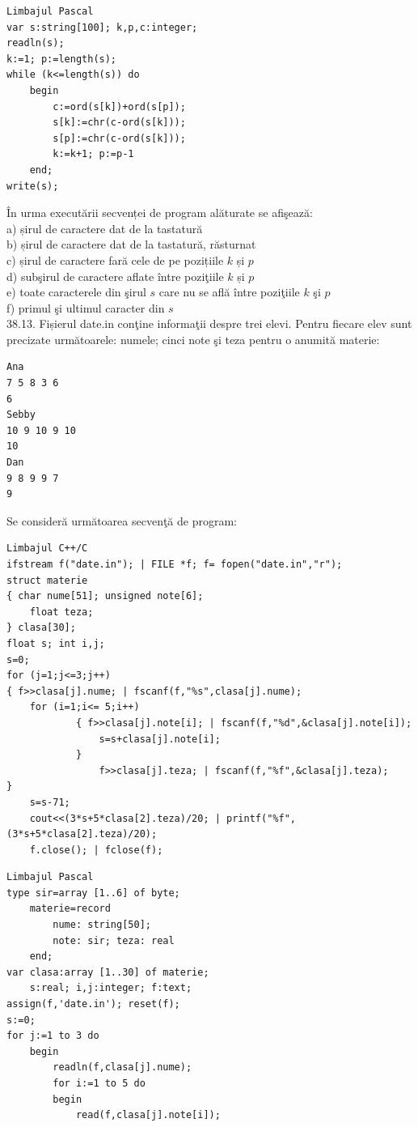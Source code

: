 \begin{itemize}
\begin{enumerate}
\begin{verbatim}
\end{verbatim}
\begin{verbatim}
Limbajul Pascal
var s:string[100]; k,p,c:integer;
readln(s);
k:=1; p:=length(s);
while (k<=length(s)) do
    begin
        c:=ord(s[k])+ord(s[p]);
        s[k]:=chr(c-ord(s[k]));
        s[p]:=chr(c-ord(s[k]));
        k:=k+1; p:=p-1
    end;
write(s);
\end{verbatim}
În urma executării secvenței de program alăturate se afişează:
\\
a) șirul de caractere dat de la tastatură
\\
b) șirul de caractere dat de la tastatură, răsturnat
\\
c) șirul de caractere fară cele de pe pozițiile $k$ și $p$
\\
d) subşirul de caractere aflate între poziţiile $k$ și $p$
\\
e) toate caracterele din şirul $s$ care nu se află între poziţiile $k$ şi $p$
\\
f) primul şi ultimul caracter din $s$
\\
38.13. Fișierul date.in conţine informaţii despre trei elevi. Pentru fiecare elev sunt precizate următoarele: numele; cinci note şi teza pentru o anumită materie:
\begin{verbatim}
Ana
7 5 8 3 6
6
Sebby
10 9 10 9 10
10
Dan
9 8 9 9 7
9
\end{verbatim}
Se consideră următoarea secvenţă de program:
\begin{verbatim}
Limbajul C++/C
ifstream f("date.in"); | FILE *f; f= fopen("date.in","r");
struct materie
{ char nume[51]; unsigned note[6];
    float teza;
} clasa[30];
float s; int i,j;
s=0;
for (j=1;j<=3;j++)
{ f>>clasa[j].nume; | fscanf(f,"%s",clasa[j].nume);
    for (i=1;i<= 5;i++)
            { f>>clasa[j].note[i]; | fscanf(f,"%d",&clasa[j].note[i]);
                s=s+clasa[j].note[i];
            }
                f>>clasa[j].teza; | fscanf(f,"%f",&clasa[j].teza);
}
    s=s-71;
    cout<<(3*s+5*clasa[2].teza)/20; | printf("%f",(3*s+5*clasa[2].teza)/20);
    f.close(); | fclose(f);
\end{verbatim}
\begin{verbatim}
Limbajul Pascal
type sir=array [1..6] of byte;
    materie=record
        nume: string[50];
        note: sir; teza: real
    end;
var clasa:array [1..30] of materie;
    s:real; i,j:integer; f:text;
assign(f,'date.in'); reset(f);
s:=0;
for j:=1 to 3 do
    begin
        readln(f,clasa[j].nume);
        for i:=1 to 5 do
        begin
            read(f,clasa[j].note[i]);

\end{verbatim}
\end{enumerate}
\end{itemize}
